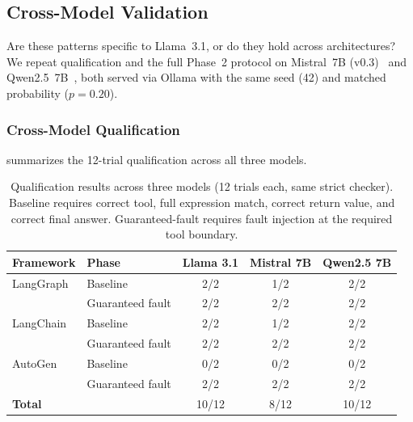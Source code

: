 \documentclass[make,article,submit,moreauthors,pdftex]{mdpi}
\begin{document}
\subsection{Cross-Model Validation}\label{sec:cross-model}

{\color{green!50!black}Are these patterns specific to Llama~3.1, or do they hold across architectures? We repeat qualification and the full Phase~2 protocol on Mistral~7B (v0.3)~\cite{mistral2024} and Qwen2.5~7B~\cite{qwen25_2024}, both served via Ollama with the same seed (42) and matched probability ($p = 0.20$).}

\subsubsection{Cross-Model Qualification}

 summarizes the 12-trial qualification across all three models.

\begin{table}[htbp]
\caption{Qualification results across three models (12 trials each, same strict checker). Baseline requires correct tool, full expression match, correct return value, and correct final answer. Guaranteed-fault requires fault injection at the required tool boundary.}\label{tab:cross-model-qualification}
\centering
\begin{tabular}{llccc}
\toprule
\textbf{Framework} & \textbf{Phase} & \textbf{Llama 3.1} & \textbf{Mistral 7B} & \textbf{Qwen2.5 7B} \\
\midrule
LangGraph  & Baseline         & 2/2 & 1/2 & 2/2 \\
           & Guaranteed fault & 2/2 & 2/2 & 2/2 \\
LangChain  & Baseline         & 2/2 & 1/2 & 2/2 \\
           & Guaranteed fault & 2/2 & 2/2 & 2/2 \\
AutoGen    & Baseline         & 0/2 & 0/2 & 0/2 \\
           & Guaranteed fault & 2/2 & 2/2 & 2/2 \\
\midrule
\textbf{Total}     &                  & 10/12 & 8/12 & 10/12 \\
\bottomrule
\end{tabular}
\end{table}
\end{document}
